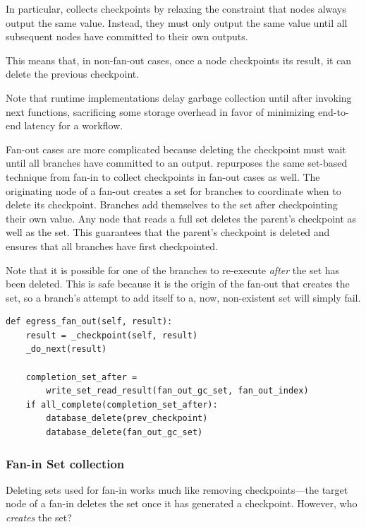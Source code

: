In particular, \name{} collects checkpoints by relaxing the constraint that
nodes always output the same value. Instead, they must only output the same
value until all subsequent nodes have committed to their own outputs.

This means that, in non-fan-out cases, once a node checkpoints its result, it
can delete the previous checkpoint.

Note that \name{} runtime implementations delay garbage collection until after
invoking next functions, sacrificing some storage overhead in favor of
minimizing end-to-end latency for a workflow.

Fan-out cases are more complicated because deleting the checkpoint must wait
until all branches have committed to an output. \name{} repurposes the same
set-based technique from fan-in to collect checkpoints in fan-out cases as well.
The originating node of a fan-out creates a set for branches to coordinate when
to delete its checkpoint. Branches add themselves to the set after checkpointing
their own value. Any node that reads a full set deletes the parent's checkpoint
as well as the set. This guarantees that the parent's checkpoint is deleted and
ensures that all branches have first checkpointed.

Note that it is possible for one of the branches to re-execute \emph{after} the
set has been deleted. This is safe because it is the origin of the fan-out that
creates the set, so a branch's attempt to add itself to a, now, non-existent set
will simply fail.

\begin{verbatim}
def egress_fan_out(self, result):
    result = _checkpoint(self, result)
    _do_next(result)

    completion_set_after =
        write_set_read_result(fan_out_gc_set, fan_out_index)
    if all_complete(completion_set_after):
        database_delete(prev_checkpoint)
        database_delete(fan_out_gc_set)
\end{verbatim}

\subsubsection{Fan-in Set collection}

Deleting sets used for fan-in works much like removing checkpoints---the target
node of a fan-in deletes the set once it has generated a checkpoint. However,
who \emph{creates} the set?

